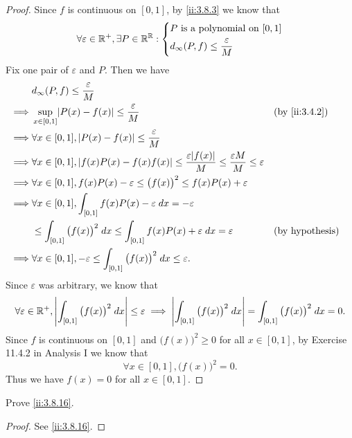 \begin{proof}
  Since \(f\) is continuous on \([0, 1]\), by \cref{ii:3.8.3} we know that
  \[
    \forall \varepsilon \in \mathbb{R}^+, \exists P \in \mathbb{R}^{\mathbb{R}} : \begin{dcases}
      P \text{ is a polynomial on } [0, 1] \\
      d_{\infty}(P, f) \leq \dfrac{\varepsilon}{M}
    \end{dcases}
  \]
  Fix one pair of \(\varepsilon\) and \(P\).
  Then we have
  \begin{align*}
             & d_\infty(P, f) \leq \dfrac{\varepsilon}{M}                                                                                                                          \\
    \implies & \sup_{x \in [0, 1]} \abs{P(x) - f(x)} \leq \dfrac{\varepsilon}{M}                                                                       &  & \by{ii:3.4.2}          \\
    \implies & \forall x \in [0, 1], \abs{P(x) - f(x)} \leq \dfrac{\varepsilon}{M}                                                                                                 \\
    \implies & \forall x \in [0, 1], \abs{f(x) P(x) - f(x) f(x)} \leq \dfrac{\varepsilon \abs{f(x)}}{M} \leq \dfrac{\varepsilon M}{M} \leq \varepsilon                             \\
    \implies & \forall x \in [0, 1], f(x) P(x) - \varepsilon \leq \big(f(x)\big)^2 \leq f(x) P(x) + \varepsilon                                                                    \\
    \implies & \forall x \in [0, 1], \int_{[0, 1]} f(x) P(x) - \varepsilon \; dx = -\varepsilon                                                                                    \\
             & \leq \int_{[0, 1]} \big(f(x)\big)^2 \; dx \leq \int_{[0, 1]} f(x) P(x) + \varepsilon \; dx = \varepsilon                                &  & \text{(by hypothesis)} \\
    \implies & \forall x \in [0, 1], -\varepsilon \leq \int_{[0, 1]} \big(f(x)\big)^2 \; dx \leq \varepsilon.
  \end{align*}
  Since \(\varepsilon\) was arbitrary, we know that
  \[
    \forall \varepsilon \in \mathbb{R}^+, \left\lvert\int_{[0, 1]} \big(f(x)\big)^2 \; dx\right\rvert \leq \varepsilon \implies \left\lvert\int_{[0, 1]} \big(f(x)\big)^2 \; dx\right\rvert = \int_{[0, 1]} \big(f(x)\big)^2 \; dx = 0.
  \]
  Since \(f\) is continuous on \([0, 1]\) and \(\big(f(x)\big)^2 \geq 0\) for all \(x \in [0, 1]\), by Exercise 11.4.2 in Analysis I we know that
  \[
    \forall x \in [0, 1], \big(f(x)\big)^2 = 0.
  \]
  Thus we have \(f(x) = 0\) for all \(x \in [0, 1]\).
\end{proof}

\begin{ex}\label{ii:ex:3.8.9}
  Prove \cref{ii:3.8.16}.
\end{ex}

\begin{proof}
  See \cref{ii:3.8.16}.
\end{proof}
